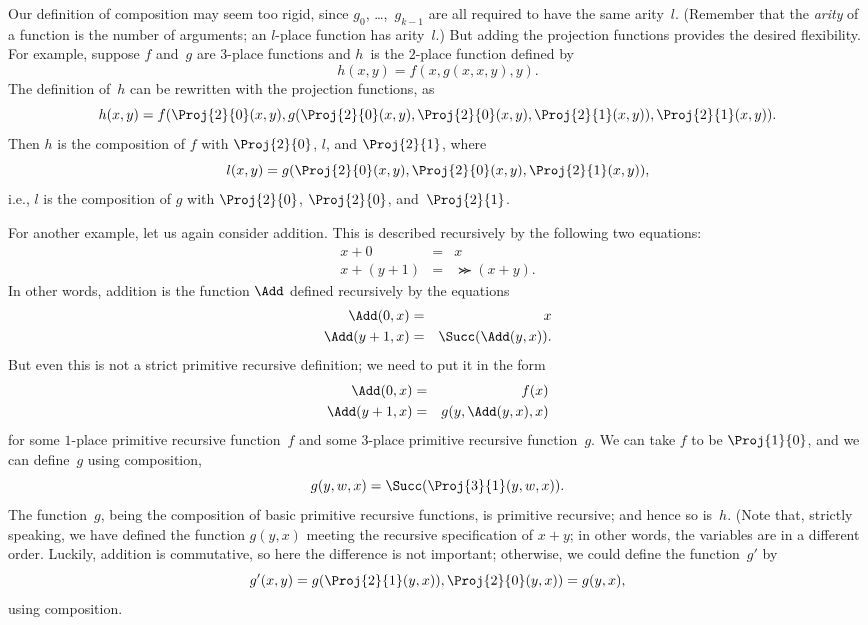 \documentclass[../../../include/open-logic-section]{subfiles}
\begin{document}
Our definition of composition may seem too rigid, since $g_0$,
\dots,~$g_{k-1}$ are all required to have the same
arity~$l$. (Remember that the \emph{arity} of a function is the number
of arguments; an $l$-place function has arity~$l$.) But adding the
projection functions provides the desired flexibility. For example,
suppose $f$ and~$g$ are $3$-place functions and $h$~is the $2$-place
function defined by
\[
h(x,y) = f(x,g(x,x,y),y).
\]
The definition of~$h$ can be rewritten with the projection
functions, as
\[
h(x,y) = f(\Proj{2}{0}(x,y), g(\Proj{2}{0}(x,y), \Proj{2}{0}(x,y),
\Proj{2}{1}(x,y)), \Proj{2}{1}(x,y)).
\]
Then $h$ is the composition of $f$ with $\Proj{2}{0}$, $l$, and
$\Proj{2}{1}$, where
\[
l(x,y) = g(\Proj{2}{0}(x,y),\Proj{2}{0}(x,y),\Proj{2}{1}(x,y)),
\]
i.e., $l$ is the composition of $g$ with $\Proj{2}{0}$, $\Proj{2}{0}$,
and~$\Proj{2}{1}$.

For another example, let us again consider addition. This is
described recursively by the following two equations:
\begin{eqnarray*}
x + 0 & = & x \\
x + (y+1) & = & \Succ(x+y).
\end{eqnarray*}
In other words, addition is the function $\Add$ defined recursively by
the equations
\begin{eqnarray*}
\Add(0,x) & = & x \\
\Add(y+1,x) & = & \Succ(\Add(y,x)).
\end{eqnarray*}
But even this is not a strict primitive recursive definition; we need
to put it in the form
\begin{eqnarray*}
\Add(0,x) & = & f(x) \\
\Add(y+1,x) & = & g(y,\Add(y,x),x)
\end{eqnarray*}
for some $1$-place primitive recursive function~$f$ and some $3$-place
primitive recursive function~$g$. We can take $f$ to be $\Proj{1}{0}$, and
we can define~$g$ using composition,
\[
g(y,w,x) = \Succ(\Proj{3}{1}(y,w,x)).
\]
The function~$g$, being the composition of basic primitive recursive
functions, is primitive recursive; and hence so is~$h$. (Note that,
strictly speaking, we have defined the function $g(y, x)$ meeting the
recursive specification of $x + y$; in other words, the variables are
in a different order. Luckily, addition is commutative, so here the
difference is not important; otherwise, we could define the
function~$g'$ by
\[
g'(x,y) = g(\Proj{2}{1}(y,x)),\Proj{2}{0}(y,x)) = g(y,x),
\]
using composition.
\end{document}
